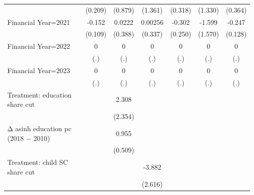\begin{table}[htbp]
\begin{tabular}{l*{6}{c}}
                    &     (0.209)         &     (0.879)         &     (1.361)         &     (0.318)         &     (1.330)         &     (0.364)         \\
\addlinespace
Financial Year=2021 &      -0.152         &      0.0222         &     0.00256         &      -0.302         &      -1.599         &      -0.247\sym{*}  \\
                    &     (0.109)         &     (0.388)         &     (0.337)         &     (0.250)         &     (1.570)         &     (0.128)         \\
\addlinespace
Financial Year=2022 &           0         &           0         &           0         &           0         &           0         &           0         \\
                    &         (.)         &         (.)         &         (.)         &         (.)         &         (.)         &         (.)         \\
\addlinespace
Financial Year=2023 &           0         &           0         &           0         &           0         &           0         &           0         \\
                    &         (.)         &         (.)         &         (.)         &         (.)         &         (.)         &         (.)         \\
\addlinespace
Treatment: education share cut&                     &       2.308         &                     &                     &                     &                     \\
                    &                     &     (2.354)         &                     &                     &                     &                     \\
\addlinespace
Δ asinh education pc (2018 − 2010)&                     &       0.955\sym{*}  &                     &                     &                     &                     \\
                    &                     &     (0.509)         &                     &                     &                     &                     \\
\addlinespace
Treatment: child SC share cut&                     &                     &      -3.882         &                     &                     &                     \\
                    &                     &                     &     (2.616)         &                     &                     &                     \\

\end{tabular}
\end{table}
